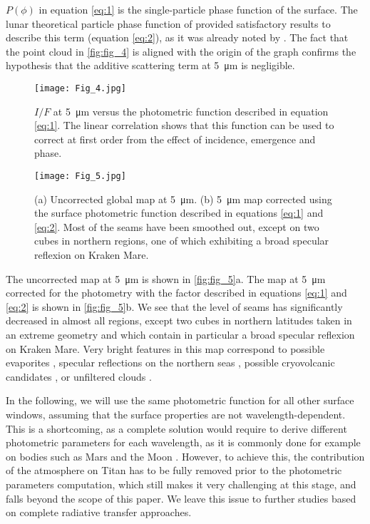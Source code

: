 \documentclass[preprint,twocolumn,5p,authoryear,compress,colorlinks=true]{elsarticle}
\newcommand{\figref}[1]{\autoref{fig:#1}}
\begin{document}
{$P(\phi)$ in equation \eqref{eq:1} is the single-particle phase function of the surface. The lunar theoretical particle phase function of \cite{Hapke1963} provided satisfactory results to describe this term (equation \eqref{eq:2}), as it was already noted by \cite{Cornet2012}. The fact that the point cloud in \figref{fig_4} is aligned with the origin of the graph confirms the hypothesis that the additive scattering term at \SI{5}{\um} is negligible.

\begin{figure}[!ht]
 \texttt{[image: Fig\_4.jpg]}
 \caption{$I/F$ at \SI{5}{\um} versus the photometric function described in equation \eqref{eq:1}. The linear correlation shows that this function can be used to correct at first order from the effect of incidence, emergence and phase.}
 \label{fig:fig_4}
\end{figure}

\begin{figure}[!ht]
 \texttt{[image: Fig\_5.jpg]}
 \caption{(a) Uncorrected global map at \SI{5}{\um}. (b) \SI{5}{\um} map corrected using the surface photometric function described in equations \eqref{eq:1} and \eqref{eq:2}. Most of the seams have been smoothed out, except on two cubes in northern regions, one of which exhibiting a broad specular reflexion on Kraken Mare.}
 \label{fig:fig_5}
\end{figure}

The uncorrected map at \SI{5}{\um} is shown in \figref{fig_5}a. The map at \SI{5}{\um} corrected for the photometry with the factor described in equations \eqref{eq:1} and \eqref{eq:2} is shown in \figref{fig_5}b. We see that the level of seams has significantly decreased in almost all regions, except two cubes in northern latitudes taken in an extreme geometry and which contain in particular a broad specular reflexion on Kraken Mare. Very bright features in this map correspond to possible evaporites \citep{Barnes2011, MacKenzie2014}, specular reflections on the northern seas \citep{Sotin2012, Soderblom2012, Barnes2013a, Barnes2014}, possible cryovolcanic candidates \citep{Lopes2013}, or unfiltered clouds \citep{Turtle2018}.

In the following, we will use the same photometric function for all other surface windows, assuming that the surface properties are not wavelength-dependent. This is a shortcoming, as a complete solution would require to derive different photometric parameters for each wavelength, as it is commonly done for example on bodies such as Mars \citep{Binder1972} and the Moon \citep{Lane1973}. However, to achieve this, the contribution of the atmosphere on Titan has to be fully removed prior to the photometric parameters computation, which still makes it very challenging at this stage, and falls beyond the scope of this paper. We leave this issue to further studies based on complete radiative transfer approaches.

}
\end{document}
